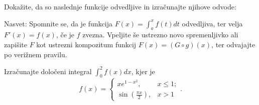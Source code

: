 \documentclass[11pt,a4paper]{exam}
\renewcommand{\leq}{\leqslant} %
\renewcommand{\{}{\lbrace}
\renewcommand{\}}{\rbrace}
\begin{document}
\begin{questions}
				\question Dokažite, da so naslednje funkcije odvedljive in izračunajte njihove odvode: 
				Nasvet: Spomnite se, da je funkcija $F(x) = \int_{a}^{x} f(t) dt$ odvedljiva, ter velja $F'(x) = f(x)$, če je $f$ zvezna. Vpeljite še ustrezno novo spremenljivko ali zapišite $F$ kot ustrezni kompozitum funkcij $F(x) = (G \circ g)(x)$, ter odvajajte po verižnem pravilu.

				\question Izračunajte določeni integral $\int_{0}^{2}f(x) dx$, kjer je 
				\[f(x) = \begin{cases}
					x e^{1-x^{2}}, & x \leq 1; \\
					\sin\left( \frac{\pi x}{2} \right), & x > 1
				\end{cases}.\]

\end{questions}
\pagestyle{empty}
\clearpage




\pagestyle{head}
\end{document}
